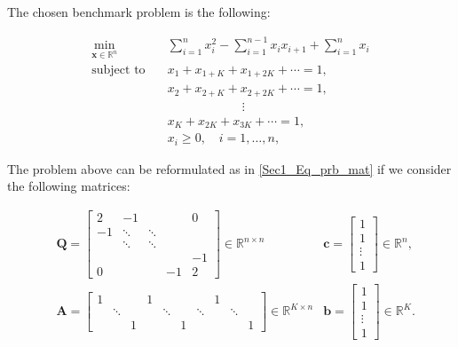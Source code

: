 The chosen benchmark problem is the following:
\begin{linenomath}
	\begin{align}
		\min_{\bm{x}\in \mathbb{R}^{n}} \quad & \sum_{i = 1}^n x_{i}^2 - \sum_{i = 1}^{n-1} x_{i}x_{i+1} + \sum_{i = 1}^n x_{i} \label{Sec1_Eq_problem} \\
		\text{subject to} \quad & x_{1} + x_{1+K} +  x_{1+2K} +\cdots = 1, \nonumber\\
		& x_{2} + x_{2+K} +  x_{2+2K} +\cdots = 1,  \nonumber\\
		& \quad\quad\quad\quad\quad\quad\vdots \nonumber\\
		& x_{K} + x_{2K} +  x_{3K} +\cdots = 1, \nonumber\\
		& x_{i} \geq 0, \quad i = 1, \dots, n,\nonumber
	\end{align}
\end{linenomath}
The problem above can be reformulated as in \ref{Sec1_Eq_prb_mat} if we consider the following matrices:

\begin{linenomath}
	\begin{align}
		&\mathbf{Q} = 
		    \begin{bmatrix}
		        2 & -1 &  &  & 0 \\
		       -1 & \ddots & \ddots &  &   \\
		         &\ddots &  \ddots & &   \\
		         &  &  &  &    -1 \\
		         0 &  &  &  -1 & 2
		    \end{bmatrix}\in \mathbb{R}^{n\times n}
		    &\bm{c} = \begin{bmatrix}
		        1 \\ 1 \\ \vdots \\ 1
		    \end{bmatrix}\in \mathbb{R}^{n}, \nonumber\\
		    &\mathbf{A} = 
		    \begin{bmatrix}
		    1 &      & &  1  &     &  &  &    1  &     &\\
		    & \ddots & &  & \ddots &  &  \ddots&   & \ddots &\\
		    &   &    1 &  &     &  1  &  &   &  &     1
		    \end{bmatrix}\in \mathbb{R}^{K\times n}
    		&\bm{b} = \begin{bmatrix}
		        1 \\ 1 \\ \vdots \\ 1
		    \end{bmatrix}\in \mathbb{R}^{K}. \nonumber\\
		\end{align} 
\end{linenomath}


